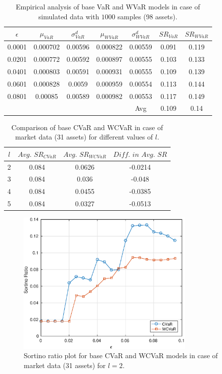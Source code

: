\documentclass[12pt]{article}
\numberwithin{equation}{section}
\begin{document}
\begin{table}[!h]
\centering
\captionsetup{justification=centering}
\begin{tabular}{||c|c|c|c|c|c|c||}
\hline
$\epsilon$ & $\mu_{VaR}$ & $\sigma_{VaR}^{d}$ & $\mu_{WVaR}$ & $\sigma_{WVaR}^{d}$ & $SR_{VaR}$ & $SR_{WVaR}$\\
\hline
0.0001 & 0.000702 & 0.00596 & 0.000822 & 0.00559 & 0.091 & 0.119 \\
0.0201 &0.000772 & 0.00592 & 0.000897 & 0.00555 & 0.103 & 0.133 \\
0.0401 & 0.000803 & 0.00591 & 0.000931 & 0.00555 & 0.109 & 0.139 \\
0.0601 & 0.000828 & 0.0059 & 0.000959 & 0.00554 & 0.113 & 0.144 \\
0.0801 & 0.00085 & 0.00589 & 0.000982 & 0.00553 & 0.117 & 0.149 \\
\hline
& & & & Avg & 0.109 & 0.14 \\
\hline
\end{tabular}
\caption{Empirical analysis of base VaR and WVaR models in case of simulated data with $1000$ samples (98 assets).}
\label{tab:5.6}
\end{table}

\clearpage

\begin{table}[!h]
\centering
\captionsetup{justification=centering}
\begin{tabular}{||c|c|c|c||}
\hline
$l$ & $Avg. \, \, SR_{CVaR}$ & $Avg. \, \, SR_{WCVaR}$ & $Diff. \, \, in \, \, Avg. \, \, SR$ \\
\hline
2 & 0.084 & 0.0626 & -0.0214 \\
3 & 0.084 & 0.036 & -0.048 \\
4 & 0.084 & 0.0455 & -0.0385 \\
5 & 0.084 & 0.0327 & -0.0513 \\
\hline
\end{tabular}
\caption{Comparison of base CVaR and WCVaR in case of market data (31 assets) for different values of $l$.}
\label{avgtab:6.1}
\end{table}

\begin{figure}[!h]
\centering
\includegraphics[height=7.0cm]{cvar_30m_2.eps}
\caption{Sortino ratio plot for base CVaR and WCVaR models in case of market data (31 assets) for $l=2$.}
\label{fig:6.1}
\end{figure}
\end{document}
